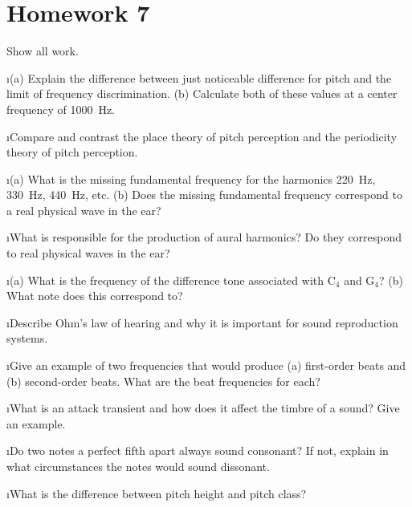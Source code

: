 \section{Homework 7}

\noindent
Show all work.

\ben

\i (a) Explain the difference between just noticeable
difference for pitch and 
the limit of frequency discrimination.
(b) Calculate both of these values at a center frequency of
1000~Hz.

\i Compare and contrast the place theory of pitch 
perception and the periodicity theory of pitch perception.
 
\i (a) What is the missing fundamental frequency for the
harmonics 220~Hz, 330~Hz, 440~Hz, etc.
(b) Does the missing fundamental frequency correspond
to a real physical wave in the ear?

\i What is responsible for the production of aural harmonics?
Do they correspond to real physical waves in the ear?

\i (a) What is the frequency of the difference tone 
associated with C${}_4$ and G${}_4$?
(b) What note does this correspond to?

\i Describe Ohm's law of hearing and why it is important
for sound reproduction systems.

\i Give an example of two frequencies that would produce
(a) first-order beats and (b) second-order beats.
What are the beat frequencies for each?

\i What is an attack transient and how does it affect the
timbre of a sound?
Give an example.

\i Do two notes a perfect fifth apart always sound consonant?
If not, explain in what circumstances the notes would sound
dissonant.

\i What is the difference between pitch height and pitch class?
\een


